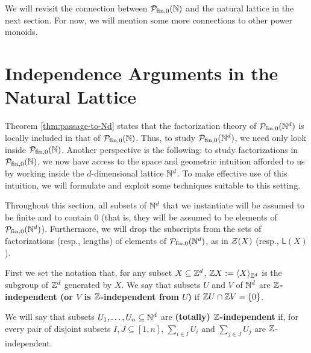 We will revisit the connection between ${\mathcal{P}_{\textrm{fin},0}(\mathbb{N})}$ and the natural lattice in the next section.
For now, we will mention some more connections to other power monoids.










\section{Independence Arguments in the Natural Lattice}

Theorem \ref{thm:passage-to-Nd} states that the factorization theory of $\mathcal{P}_{\textrm{fin}, 0}(\mathbb{N}^d)$ is locally included in that of ${\mathcal{P}_{\textrm{fin},0}(\mathbb{N})}$.
Thus, to study $\mathcal{P}_{\textrm{fin}, 0}(\mathbb{N}^d)$, we need only look inside ${\mathcal{P}_{\textrm{fin},0}(\mathbb{N})}$. 
Another perspective is the following: to study factorizations in ${\mathcal{P}_{\textrm{fin},0}(\mathbb{N})}$, we now have access to the space and geometric intuition afforded to us by working inside the $d$-dimensional lattice $\mathbb{N}^d$.
To make effective use of this intuition, we will formulate and exploit some techniques suitable to this setting.

Throughout this section, all subsets of $\mathbb{N}^d$ that we instantiate will be assumed to be finite and to contain $0$ (that is, they will be assumed to be elements of $\mathcal{P}_{\textrm{fin}, 0}(\mathbb{N}^d)$).
Furthermore, we will drop the subscripts from the sets of factorizations (resp., lengths) of elements of $\mathcal{P}_{\textrm{fin}, 0}(\mathbb{N}^d)$, as in $\mathcal{Z}(X)$ (resp., $\mathsf{L}(X)$).

\begin{defn}
First we set the notation that, for any subset $X \subseteq \mathbb{Z}^d$, $\mathbb{Z} X := \langle X \rangle_{\mathbb{Z}^d}$ is the subgroup of $\mathbb{Z}^d$ generated by $X$.
We say that subsets $U$ and $V$ of $\mathbb{N}^d$ are \textbf{$\mathbb{Z}$-independent (or $V$ is $\mathbb{Z}$-independent from $U$)} if $\mathbb{Z} U \cap \mathbb{Z} V = \{0\}$.

We will say that subsets $U_1,\dots, U_n\subseteq \mathbb{N}^d$ are \textbf{(totally) $\mathbb{Z}$-independent} if, for every pair of disjoint subsets $I,J\subseteq[ 1,n ]$, $\sum_{i\in I} U_i$ and $\sum_{j\in J} U_j$ are $\mathbb{Z}$-independent.
\end{defn}

